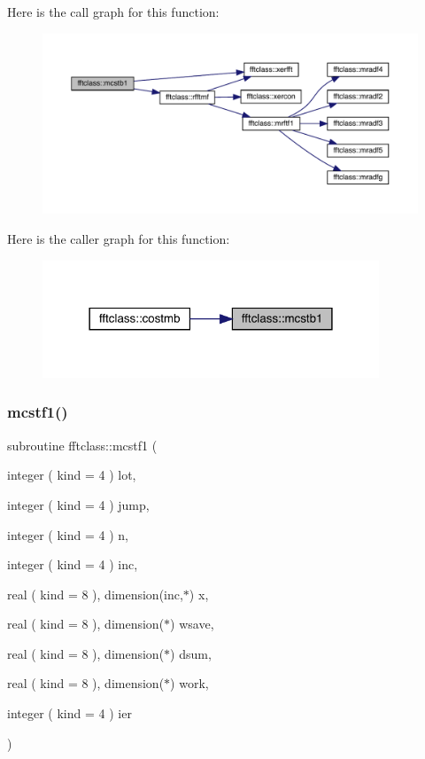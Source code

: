 Here is the call graph for this function\+:\nopagebreak
\begin{figure}[H]
\begin{center}
\leavevmode
\includegraphics[width=350pt]{namespacefftclass_a10f96df2a58ce7f2e6ac9eaddf09588e_cgraph}
\end{center}
\end{figure}
Here is the caller graph for this function\+:\nopagebreak
\begin{figure}[H]
\begin{center}
\leavevmode
\includegraphics[width=285pt]{namespacefftclass_a10f96df2a58ce7f2e6ac9eaddf09588e_icgraph}
\end{center}
\end{figure}
\mbox{\label{namespacefftclass_aac5cdc09f4e9979eb972972e1db55cb3}} 
\subsubsection{\texorpdfstring{mcstf1()}{mcstf1()}}
{\footnotesize\ttfamily subroutine fftclass\+::mcstf1 (\begin{DoxyParamCaption}\item[{integer ( kind = 4 )}]{lot,  }\item[{integer ( kind = 4 )}]{jump,  }\item[{integer ( kind = 4 )}]{n,  }\item[{integer ( kind = 4 )}]{inc,  }\item[{real ( kind = 8 ), dimension(inc,$\ast$)}]{x,  }\item[{real ( kind = 8 ), dimension($\ast$)}]{wsave,  }\item[{real ( kind = 8 ), dimension($\ast$)}]{dsum,  }\item[{real ( kind = 8 ), dimension($\ast$)}]{work,  }\item[{integer ( kind = 4 )}]{ier }\end{DoxyParamCaption})}

